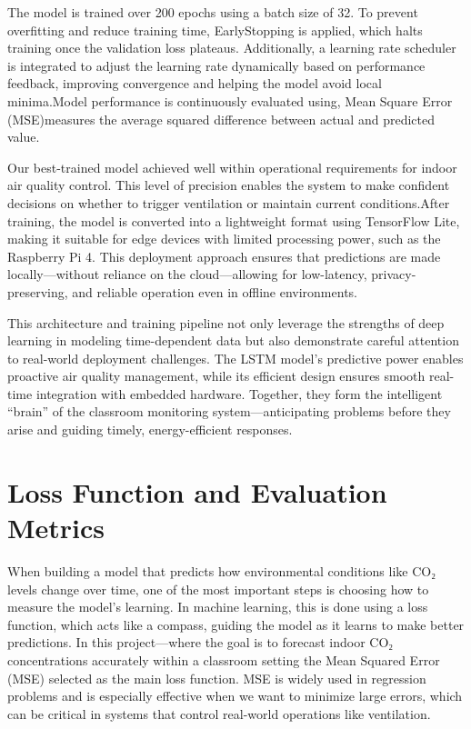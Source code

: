The model is trained over 200 epochs using a batch size of 32. To prevent overfitting and reduce training time, EarlyStopping is applied, which halts training once the validation loss plateaus. Additionally, a learning rate scheduler is integrated to adjust the learning rate dynamically based on performance feedback, improving convergence and helping the model avoid local minima.Model performance is continuously evaluated using, Mean Square Error (MSE)measures the average squared difference between actual and predicted value.

Our best-trained model achieved well within operational requirements for indoor air quality control. This level of precision enables the system to make confident decisions on whether to trigger ventilation or maintain current conditions.After training, the model is converted into a lightweight format using TensorFlow Lite, making it suitable for edge devices with limited processing power, such as the Raspberry Pi 4. This deployment approach ensures that predictions are made locally—without reliance on the cloud—allowing for low-latency, privacy-preserving, and reliable operation even in offline environments.

 This architecture and training pipeline not only leverage the strengths of deep learning in modeling time-dependent data but also demonstrate careful attention to real-world deployment challenges. The LSTM model's predictive power enables proactive air quality management, while its efficient design ensures smooth real-time integration with embedded hardware. Together, they form the intelligent “brain” of the classroom monitoring system—anticipating problems before they arise and guiding timely, energy-efficient responses.

\section{Loss Function and Evaluation Metrics}
When building a model that predicts how environmental conditions like CO₂ levels change over time, one of the most important steps is choosing how to measure the model’s learning. In machine learning, this is done using a loss function, which acts like a compass, guiding the model as it learns to make better predictions. In this project—where the goal is to forecast indoor CO₂ concentrations accurately within a classroom setting  the Mean Squared Error (MSE) selected as the main loss function. MSE is widely used in regression problems and is especially effective when we want to minimize large errors, which can be critical in systems that control real-world operations like ventilation.

